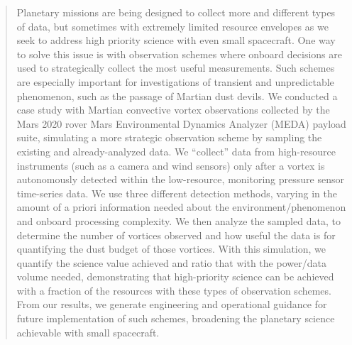 \begin{abstract}
Planetary missions are being designed to collect more and different types of data, but  sometimes with extremely limited resource envelopes as we seek to address high priority science with even small spacecraft. 
One way to solve this issue is with observation schemes where onboard decisions are used to strategically collect the most useful measurements.
Such schemes are especially important for investigations of transient and unpredictable phenomenon, such as the passage of Martian dust devils.
We conducted a case study with Martian convective vortex observations collected by the Mars 2020 rover Mars Environmental Dynamics Analyzer (MEDA) payload suite, simulating a more strategic observation scheme by sampling the existing and already-analyzed data.
We ``collect'' data from high-resource instruments (such as a camera and wind sensors) only after a vortex is autonomously detected within the low-resource, monitoring pressure sensor time-series data.
We use three different detection methods, varying in the amount of a priori information needed about the environment/phenomenon and onboard processing complexity.
We then analyze the sampled data, to determine the number of vortices observed and how useful the data is for quantifying the dust budget of those vortices.
With this simulation, we quantify the science value achieved and ratio that with the power/data volume needed, demonstrating that high-priority science can be achieved with a fraction of the resources with these types of observation schemes.
From our results, we generate engineering and operational guidance for future implementation of such schemes, broadening the planetary science achievable with small spacecraft.

\end{abstract}